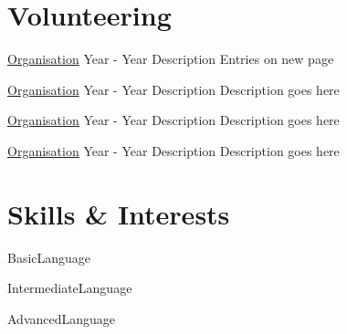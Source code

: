 \documentclass{two-column-resume}
\begin{document}
\section{Volunteering}
\begin{eventlist}

\item
{\href{https://www.link.com}{Organisation}}%
{Year - Year}%
{Description}%
{Entries on new page}%

\item
{\href{https://www.link.com}{Organisation}}%
{Year - Year}%
{Description}%
{Description goes here}%

\item
{\href{https://www.link.com}{Organisation}}%
{Year - Year}%
{Description}%
{Description goes here}%

\item
{\href{https://www.link.com}{Organisation}}%
{Year - Year}%
{Description}%
{Description goes here}%

\end{eventlist}
\section{Skills \& Interests}
\begin{skilllist}

\item{Basic}{Language}%
\item{Intermediate}{Language}%
\item{Advanced}{Language}%

\end{skilllist}
\end{document}
